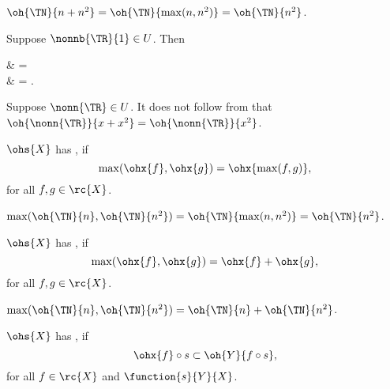 \documentclass[b5paper, english, oneside]{memoir}
\begin{document}
\begin{example}
$\oh{\TN}{n + n^2} = \oh{\TN}{\max(n, n^2)} = \oh{\TN}{n^2}$.
\end{example}

\begin{example}
Suppose $\nonnb{\TR}{1} \in U$. Then
\begin{eqs}
 & =  \\
{} & = .
\end{eqs}
\end{example}

\begin{example}
Suppose $\nonn{\TR} \in U$. It does not follow from  that $\oh{\nonn{\TR}}{x + x^2} = \oh{\nonn{\TR}}{x^2}$.
\end{example}

\begin{definition}
$\ohs{X}$ has , if
\begin{equation}
\max(\ohx{f}, \ohx{g}) = \ohx{\max(f, g)},
\end{equation}
for all $f, g \in \rc{X}$.
\end{definition}

\begin{example}
$\max(\oh{\TN}{n}, \oh{\TN}{n^2}) = \oh{\TN}{\max(n, n^2)} = \oh{\TN}{n^2}$.
\end{example}

\begin{definition}
$\ohs{X}$ has , if
\begin{equation}
\max(\ohx{f}, \ohx{g}) = \ohx{f} + \ohx{g},
\end{equation}
for all $f, g \in \rc{X}$.
\end{definition}

\begin{example}
$\max(\oh{\TN}{n}, \oh{\TN}{n^2}) = \oh{\TN}{n} + \oh{\TN}{n^2}$.
\end{example}

\begin{definition}
$\ohs{X}$ has , if
\begin{equation}
\ohx{f} \circ s \subset \oh{Y}{f \circ s},
\end{equation}
for all $f \in \rc{X}$ and $\function{s}{Y}{X}$.
\end{definition}
\end{document}
